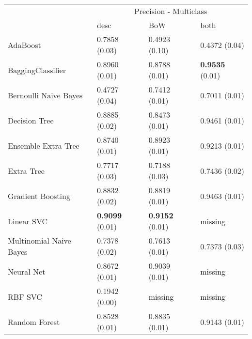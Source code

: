 \begin{tabular}{|l|l|l|l| }
\hline
 &  \multicolumn{3}{c|}{ Precision - Multiclass} \\
\cline{2-4} & desc & BoW & both \\ \hline
AdaBoost                & 0.7858 (0.03) & 0.4923 (0.10) & 0.4372 (0.04)\\
BaggingClassifier       & 0.8960 (0.01) & 0.8788 (0.01) & {\bf 0.9535} (0.01)\\
Bernoulli Naive Bayes   & 0.4727 (0.04) & 0.7412 (0.01) & 0.7011 (0.01)\\
Decision Tree           & 0.8885 (0.02) & 0.8473 (0.01) & 0.9461 (0.01)\\
Ensemble Extra Tree     & 0.8740 (0.01) & 0.8923 (0.01) & 0.9213 (0.01)\\
Extra Tree              & 0.7717 (0.03) & 0.7188 (0.03) & 0.7436 (0.02)\\
Gradient Boosting       & 0.8832 (0.02) & 0.8819 (0.01) & 0.9463 (0.01)\\
Linear SVC              & {\bf 0.9099} (0.01) & {\bf 0.9152} (0.01) & missing \\
Multinomial Naive Bayes & 0.7378 (0.02) & 0.7613 (0.01) & 0.7373 (0.03)\\
Neural Net              & 0.8672 (0.01) & 0.9039 (0.01) & missing \\
RBF SVC                 & 0.1942 (0.00) & missing  & missing \\
Random Forest           & 0.8528 (0.01) & 0.8835 (0.01) & 0.9143 (0.01)\\
\hline
\end{tabular}
